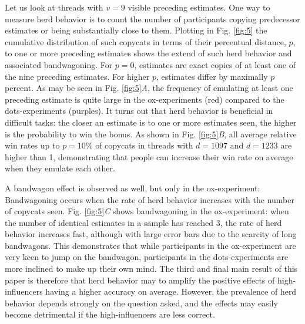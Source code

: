 \documentclass[9pt,twocolumn,twoside,lineno]{article}
\begin{document}
Let us look at threads with $v=9$ visible preceding estimates. One way to measure herd behavior is to count the number of participants copying predecessor estimates or being substantially close to them. Plotting in Fig. \ref{fig:5} the cumulative distribution of such copycats in terms of their percentual distance, $p$, to one or more preceding estimates shows the extend of such herd behavior and associated bandwagoning. For $p=0$, estimates are exact copies of at least one of the nine preceding estimates. For higher $p$, estimates differ by maximally $p$ percent. As may be seen in Fig. \ref{fig:5}\textit{A}, the frequency of emulating at least one preceding estimate is quite large in the ox-experiments (red) compared to the dots-experiments (purples). It turns out that herd behavior is beneficial in difficult tasks: the closer an estimate is to one or more estimates seen, the higher is the probability to win the bonus. As shown in Fig. \ref{fig:5}\textit{B}, all average relative win rates up to $p=10\%$ of copycats in threads with $d=1097$ and $d=1233$ are higher than 1, demonstrating that people can increase their win rate on average when they emulate each other. 

A bandwagon effect is observed as well, but only in the ox-experiment: Bandwagoning occurs when the rate of herd behavior increases with the number of copycats seen. Fig. \ref{fig:5}\textit{C} shows bandwagoning in the ox-experiment: when the number of identical estimates in a sample has reached 3, the rate of herd behavior increases fast, although with large error bars due to the scarcity of long bandwagons. This demonstrates that while participants in the ox-experiment are very keen to jump on the bandwagon, participants in the dots-experiments are more inclined to make up their own mind. The third and final main result of this paper is therefore that herd behavior may to amplify the positive effects of high-influencers having a higher accuracy on average. However, the prevalence of herd behavior depends strongly on the question asked, and the effects may easily become detrimental if the high-influencers are less correct.
\end{document}
